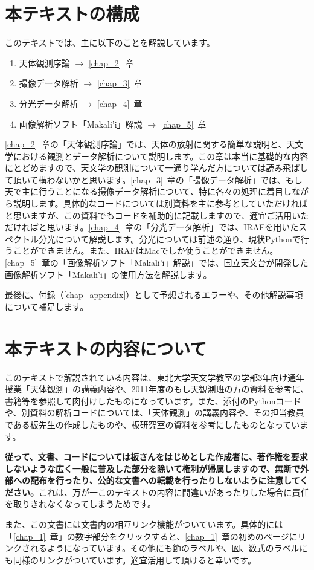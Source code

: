 \section{本テキストの構成}%
\label{sec_1_3}
このテキストでは、主に以下のことを解説しています。
\begin{enumerate}[1.]
    \item 天体観測序論 $\rightarrow$ \ref{chap_2}~章
    \item 撮像データ解析 $\rightarrow$ \ref{chap_3}~章
    \item 分光データ解析 $\rightarrow$ \ref{chap_4}~章
    \item 画像解析ソフト「Makali'i」解説 $\rightarrow$ \ref{chap_5}~章
\end{enumerate}

\ref{chap_2}~章の「天体観測序論」では、天体の放射に関する簡単な説明と、天文学における観測とデータ解析について説明します。この章は本当に基礎的な内容にとどめますので、天文学の観測について一通り学んだ方については読み飛ばして頂いて構わないかと思います。\ref{chap_3}~章の「撮像データ解析」では、もし天で主に行うことになる撮像データ解析について、特に各々の処理に着目しながら説明します。具体的なコードについては別資料を主に参考としていただければと思いますが、この資料でもコードを補助的に記載しますので、適宜ご活用いただければと思います。\ref{chap_4}~章の「分光データ解析」では、IRAFを用いたスペクトル分光について解説します。分光については前述の通り、現状Pythonで行うことができません。また、IRAFはMacでしか使うことができません。\ref{chap_5}~章の「画像解析ソフト「Makali'i」解説」では、国立天文台が開発した画像解析ソフト「Makali'i\cite{makali}」の使用方法を解説します。\par
最後に、付録（\ref{chap_appendix}）として予想されるエラーや、その他解説事項について補足します。

\section{本テキストの内容について}%
\label{sec_1_4}
このテキストで解説されている内容は、東北大学天文学教室の学部3年向け通年授業「天体観測」の講義内容や、2011年度のもし天観測班の方の資料を参考に、書籍等を参照して肉付けしたものになっています。また、添付のPythonコードや、別資料の解析コードについては、「天体観測」の講義内容や、その担当教員である板先生の作成したものや、板研究室の資料を参考にしたものとなっています。\par
\textbf{従って、文書、コードについては板さんをはじめとした作成者に、著作権を要求しないような広く一般に普及した部分を除いて権利が帰属しますので、無断で外部への配布を行ったり、公的な文書への転載を行ったりしないように注意してください。}これは、万が一このテキストの内容に間違いがあったりした場合に責任を取りきれなくなってしまうためです。\par
また、この文書には文書内の相互リンク機能がついています。具体的には「\ref{chap_1}~章」の数字部分をクリックすると、\ref{chap_1}~章の初めのページにリンクされるようになっています。その他にも節のラベルや、図、数式のラベルにも同様のリンクがついています。適宜活用して頂けると幸いです。

